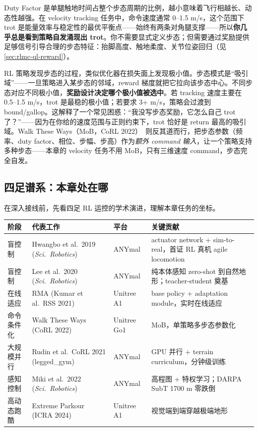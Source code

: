 Duty Factor 是单腿触地时间占整个步态周期的比例，越小意味着飞行相越长、动态性越强。在 velocity tracking 任务中，命令速度通常 0--1.5 m/s，这个范围下 trot 是能量效率与稳定性的最优平衡点——始终有两条对角腿支撑——所以\textbf{你几乎总是看到策略自发涌现出 trot}。你不需要显式定义步态；但需要通过奖励提供足够信号引导合理的步态特征：抬脚高度、触地柔度、关节位姿回归（见 \cref{sec:rlmc-ql-reward}）。

\begin{insight}[步态涌现 = 优化器在损失面上落入吸引域]\label{ins:rlmc-ql-attractor}
RL 策略发现步态的过程，类似优化器在损失面上发现极小值。步态模式是“吸引域”——一旦策略进入某步态的邻域，reward 梯度就把它拉向该步态中心。不同步态对应不同极小值，\textbf{奖励设计决定哪个极小值被选中}。若 tracking 速度主要在 0.5--1.5 m/s，trot 是最稳的极小值；若要求 3+ m/s，策略会过渡到 bound/gallop。这解释了一个常见困惑：“我没写步态奖励，它怎么自己 trot 了？”——因为在你给的速度范围与正则约束下，trot 恰好是 return 最高的吸引域。Walk These Ways（MoB，CoRL 2022）\,\cite{margolis2022walk} 则反其道而行，把步态参数（频率、duty factor、相位、步幅、步高）作为\emph{额外 command 输入}，让一个策略支持多种步态——本章的 velocity 任务不用 MoB，只有三维速度 command，步态完全自发。
\end{insight}

\subsection{四足谱系：本章处在哪}
\label{sec:rlmc-ql-history}

在深入接线前，先看四足 RL 运控的学术演进，理解本章任务的坐标。

\begin{center}
\small
\begin{tabular}{@{}lllp{4.3cm}@{}}
\toprule
阶段 & 代表工作 & 平台 & 关键贡献 \\
\midrule
盲控制 & Hwangbo et al.\ 2019 (\textit{Sci.\ Robotics}) & ANYmal & actuator network + sim-to-real，首证 RL 真机 agile locomotion \\
盲控制 & Lee et al.\ 2020 (\textit{Sci.\ Robotics})\,\cite{lee2020quadruped} & ANYmal & 纯本体感知 zero-shot 到自然地形；teacher-student 奠基 \\
在线适应 & RMA (Kumar et al.\ RSS 2021)\,\cite{kumar2021rma} & Unitree A1 & base policy + adaptation module，实时在线适应 \\
命令条件化 & Walk These Ways (CoRL 2022)\,\cite{margolis2022walk} & Unitree Go1 & MoB，单策略多步态参数化 \\
大规模并行 & Rudin et al.\ CoRL 2021 (legged\_gym)\,\cite{rudin2021minutes} & ANYmal & GPU 并行 + terrain curriculum，分钟级训练 \\
感知控制 & Miki et al.\ 2022 (\textit{Sci.\ Robotics})\,\cite{miki2022perceptive} & ANYmal & 高程图 + 特权学习；DARPA SubT 1700 m 零跌倒 \\
高动态跑酷 & Extreme Parkour (ICRA 2024)\,\cite{cheng2024parkour} & Unitree A1 & 视觉端到端穿越极端地形 \\
\bottomrule
\end{tabular}
\end{center}

